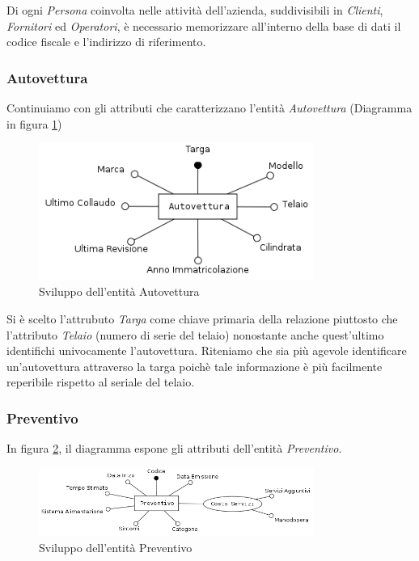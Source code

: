 			Di ogni \emph{Persona} coinvolta nelle attività dell'azienda, suddivisibili in \emph{Clienti}, \emph{Fornitori} ed \emph{Operatori}, è necessario memorizzare all'interno della base di dati il codice fiscale e l'indirizzo di riferimento.
		
		\subsubsection{Autovettura}
			
			Continuiamo con gli attributi che caratterizzano l'entità \emph{Autovettura} (Diagramma in figura \ref{fig:autovettura})
			
			\begin{figure}[H]
				\centering
				\includegraphics[width=9cm]{images/finitures/autovettura.png}
				\caption{Sviluppo dell'entità Autovettura}
				\label{fig:autovettura}
			\end{figure}
			
			Si è scelto l'attrubuto \emph{Targa} come chiave primaria della relazione piuttosto che l'attributo \emph{Telaio} (numero di serie del telaio) nonostante anche quest'ultimo identifichi univocamente l'autovettura. Riteniamo che sia più agevole identificare un'autovettura attraverso la targa poichè tale informazione è più facilmente reperibile rispetto al seriale del telaio.
			
		\subsubsection{Preventivo}
		
			In figura \ref{fig:preventivo}, il diagramma espone gli attributi dell'entità \emph{Preventivo}.
			
			\begin{figure}[H]
				\centering
				\includegraphics[width=9cm]{images/finitures/preventivo.png}
				\caption{Sviluppo dell'entità Preventivo}
				\label{fig:preventivo}
			\end{figure}
			
